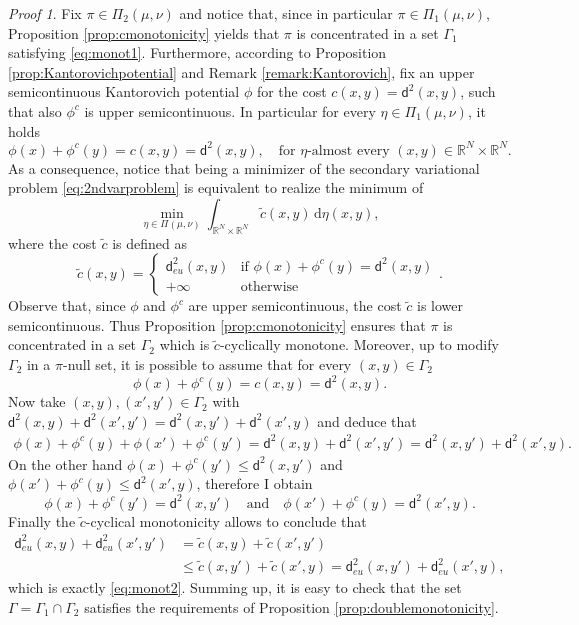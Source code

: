 \documentclass[11pt,twoside,a4paper]{article}
\newcommand{\R}{\mathbb{R}}
\newcommand{\de}{\ensuremath{\, \mathrm d}} %
\newcommand{\thmsymbol}{\( \square \)}
\newcommand{\di}{\mathsf d} %
\theoremstyle{theorem}
\theoremstyle{definition}
\theoremstyle{remark}
\theoremstyle{proof}
\newtheorem*{pro}{Proof}
\newenvironment{pr}{\begin{pro}%
 \renewcommand{\qedsymbol}{\thmsymbol}\pushQED{\qed}}%
 {\popQED\end{pro}}
\begin{document}
\begin{pr}
Fix $\pi\in \Pi_2(\mu,\nu)$ and notice that, since in particular $\pi\in \Pi_1(\mu,\nu)$, Proposition \ref{prop:cmonotonicity} yields that $\pi$ is concentrated in a set $\Gamma_1$ satisfying \eqref{eq:monot1}. Furthermore, according to Proposition \ref{prop:Kantorovichpotential} and Remark \ref{remark:Kantorovich}, fix an upper semicontinuous Kantorovich potential $\phi$ for the cost $c(x,y)=\di^2(x,y)$, such that also $\phi^c$ is upper semicontinuous. In particular for every $\eta\in \Pi_1(\mu,\nu)$, it holds 
\begin{equation*}
    \phi(x)+\phi^c(y)= c(x,y)=\di^2(x,y), \quad \text{for $\eta$-almost every $(x,y)\in \R^N\times\R^N$}.
\end{equation*}
As a consequence, notice that being a minimizer of the secondary variational problem \eqref{eq:2ndvarproblem} is equivalent to realize the minimum of 
\begin{equation*}
     \min_{\eta\in\Pi(\mu,\nu)} \int_{\R^N\times \R^N} \tilde c(x,y) \de \eta(x,y),
\end{equation*}
where the cost $\tilde c$ is defined as
\begin{equation*}
\tilde c(x,y)=
    \begin{cases}
  \di_{eu}^2(x,y) &\text{if } \phi(x)+ \phi^c(y)= \di^2(x,y) \\
       +\infty &\text{otherwise}
\end{cases}.
\end{equation*}
Observe that, since $\phi$ and $\phi^c$ are upper semicontinuous, the cost $\tilde c$ is lower semicontinuous. Thus Proposition \ref{prop:cmonotonicity} ensures that $\pi$ is concentrated in a set $\Gamma_2$ which is $\tilde c$-cyclically monotone. Moreover, up to modify $\Gamma_2$ in a $\pi$-null set, it is possible to assume that for every $(x,y)\in\Gamma_2$
\begin{equation*}
     \phi(x)+\phi^c(y)= c(x,y)=\di^2(x,y).
\end{equation*}
Now take $(x,y),(x',y')\in \Gamma_2$ with $\di^2(x,y)+\di^2(x',y') = \di^2 (x,y')+ \di^2(x',y)$ and deduce that 
\begin{align*}
    \phi(x)+\phi^c(y)+\phi(x')+\phi^c(y')=\di^2(x,y)+\di^2(x',y') = \di^2 (x,y')+ \di^2(x',y).
\end{align*}
On the other hand $\phi(x)+\phi^c(y')\leq \di^2 (x,y')$ and $\phi(x')+\phi^c(y)\leq \di^2 (x',y)$, therefore I obtain 
\begin{equation*}
    \phi(x)+\phi^c(y')= \di^2 (x,y') \quad \text{and}\quad \phi(x')+\phi^c(y)= \di^2 (x',y).
\end{equation*}
Finally the $\tilde c$-cyclical monotonicity allows to conclude that
\begin{align*}
     \di^2_{eu}(x,y)+\di^2_{eu}(x',y')&= \tilde c(x,y)+\tilde c(x',y')\\
     &\leq  \tilde c(x,y')+\tilde c(x',y)= \di^2_{eu} (x,y')+ \di^2_{eu}(x',y),
\end{align*}
which is exactly \eqref{eq:monot2}. Summing up, it is easy to check that the set $\Gamma=\Gamma_1 \cap \Gamma_2$ satisfies the requirements of Proposition \ref{prop:doublemonotonicity}.
\end{pr}
\end{document}
